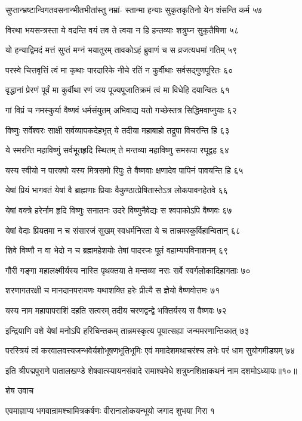 सुप्तान्भ्रष्टान्विगतवसनान्भीतभीतांस्तु नम्रां-
स्तान्मा हन्याः सुकृतकृतिनो येन शंसन्ति कर्म ५७

विरथा भयसन्त्रस्ता ये वदन्ति वयं तव
ते त्वया न हि हन्तव्याः शत्रुघ्न सुकृतैषिणा ५८

यो हन्याद्विमदं मत्तं सुप्तं मग्नं भयातुरम्
तावकोऽहं ब्रुवाणं च स व्रजत्यधमां गतिम् ५९

परस्वे चित्तवृत्तिं त्वं मा कृथाः पारदारिके
नीचे रतिं न कुर्वीथाः सर्वसद्गुणपूरितः ६०

वृद्धानां प्रेरणं पूर्वं मा कुर्वीथा रणं जय
पूज्यपूजातिक्रमं त्वं मा विधेहि दयान्वितः ६१

गां विप्रं च नमस्कुर्या वैष्णवं धर्मसंयुतम्
अभिवाद्य यतो गच्छेस्तत्र सिद्धिमवाप्नुयाः ६२

विष्णुः सर्वेश्वरः साक्षी सर्वव्यापकदेहभृत्
ये तदीया महाबाहो तद्रूपा विचरन्ति हि ६३

ये स्मरन्ति महाविष्णुं सर्वभूतहृदि स्थितम्
ते मन्तव्या महाविष्णु समरूपा रघूद्वह ६४

यस्य स्वीयो न पारक्यो यस्य मित्रसमो रिपुः
ते वैष्णवाः क्षणादेव पापिनं पावयन्ति हि ६५

येषां प्रियं भागवतं येषां वै ब्राह्मणाः प्रियाः
वैकुण्ठात्प्रेषितास्तेऽत्र लोकपावनहेतवे ६६

येषां वक्त्रे हरेर्नाम हृदि विष्णुः सनातनः
उदरे विष्णुनैवेद्यः स श्वपाकोऽपि वैष्णवः ६७

येषां वेदाः प्रियतमा न च संसारजं सुखम्
स्वधर्मनिरता ये च तान्नमस्कुर्विहान्वितान् ६८

शिवे विष्णौ न वा भेदो न च ब्रह्ममहेशयोः
तेषां पादरजः पूतं वहाम्यघविनाशनम् ६९

गौरी गङ्गा महालक्ष्मीर्यस्य नास्ति पृथक्तया
ते मन्तव्या नराः सर्वे स्वर्गलोकादिहागताः ७०

शरणागतरक्षी च मानदानपरायणः
यथाशक्ति हरेः प्रीत्यै स ज्ञेयो वैष्णवोत्तमः ७१

यस्य नाम महापापराशिं दहति सत्वरम्
तदीय चरणद्वन्द्वे भक्तिर्यस्य स वैष्णवः ७२

इन्द्रियाणि वशे येषां मनोऽपि हरिचिन्तकम्
तान्नमस्कृत्य पूयात्सह्या जन्ममरणान्तिकात् ७३

परस्त्रियं त्वं करवालवत्त्यजन्भवेर्यशोभूषणभूतिभूमिः
एवं ममादेशमथाचरंश्च लभेः परं धाम सुयोगमीड्यम् ७४

इति श्रीपद्मपुराणे पातालखण्डे शेषवात्स्यायनसंवादे रामाश्वमेधे शत्रुघ्नशिक्षाकथनं नाम दशमोऽध्यायः॥१०॥


शेष उवाच

एवमाज्ञाप्य भगवान्रामश्चामित्रकर्षणः
वीरानालोकयन्भूयो जगाद शुभया गिरा १

